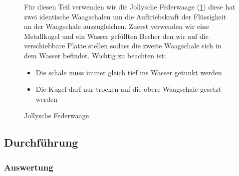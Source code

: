 \documentclass[11pt,a4paper]{article}
\begin{document}
\begin{figure}[h]
\begin{minipage}{.6\textwidth}
Für diesen Teil verwenden wir die Jollysche Federwaage (\ref{JS1}) diese hat zwei identische Waagschalen um die Auftriebskraft der Flüssigkeit an der Waagschale auszugleichen. Zuerst verwenden wir eine Metallkugel und ein Wasser gefüllten Becher den wir auf die verschiebbare Platte stellen sodass die zweite Waagschale sich in dem Wasser befindet.
 Wichtig zu beachten ist:
\begin{itemize}
	\item Die schale muss immer gleich tief ins Wasser getunkt werden
	\item Die Kugel darf nur trocken auf die obere Waagschale gesetzt werden
\end{itemize}
\end{minipage}%
\begin{minipage}{.4\textwidth}
\centering
{}
   \renewcommand\thefigure{B1}
\caption[Jollysche Federwaage]{Jollysche Federwaage \cite{Anleitung}}
\label{JS1}

\end{minipage}
\end{figure}

\subsection{Durchführung}


\subsubsection{Auswertung}
\end{document}

